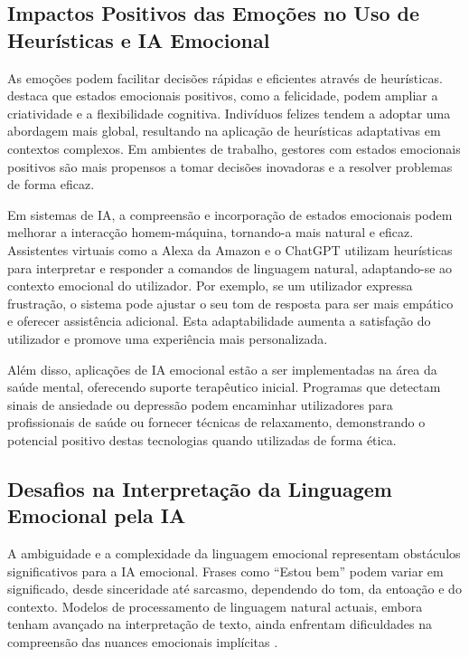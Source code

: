 \documentclass[a4paper,12pt]{report}
\begin{document}
	\subsection{Impactos Positivos das Emoções no Uso de Heurísticas e IA Emocional}
	
	As emoções podem facilitar decisões rápidas e eficientes através de heurísticas. \textcite{isen2001} destaca que estados emocionais positivos, como a felicidade, podem ampliar a criatividade e a flexibilidade cognitiva. Indivíduos felizes tendem a adoptar uma abordagem mais global, resultando na aplicação de heurísticas adaptativas em contextos complexos. Em ambientes de trabalho, gestores com estados emocionais positivos são mais propensos a tomar decisões inovadoras e a resolver problemas de forma eficaz.
	
	Em sistemas de IA, a compreensão e incorporação de estados emocionais podem melhorar a interacção homem-máquina, tornando-a mais natural e eficaz. Assistentes virtuais como a Alexa da Amazon e o ChatGPT utilizam heurísticas para interpretar e responder a comandos de linguagem natural, adaptando-se ao contexto emocional do utilizador. Por exemplo, se um utilizador expressa frustração, o sistema pode ajustar o seu tom de resposta para ser mais empático e oferecer assistência adicional. Esta adaptabilidade aumenta a satisfação do utilizador e promove uma experiência mais personalizada.
	
	Além disso, aplicações de IA emocional estão a ser implementadas na área da saúde mental, oferecendo suporte terapêutico inicial. Programas que detectam sinais de ansiedade ou depressão podem encaminhar utilizadores para profissionais de saúde ou fornecer técnicas de relaxamento, demonstrando o potencial positivo destas tecnologias quando utilizadas de forma ética.
	
	\subsection{Desafios na Interpretação da Linguagem Emocional pela IA}
	
	A ambiguidade e a complexidade da linguagem emocional representam obstáculos significativos para a IA emocional. Frases como “Estou bem” podem variar em significado, desde sinceridade até sarcasmo, dependendo do tom, da entoação e do contexto. Modelos de processamento de linguagem natural actuais, embora tenham avançado na interpretação de texto, ainda enfrentam dificuldades na compreensão das nuances emocionais implícitas \parencite{russell2020}.
	
\end{document}
